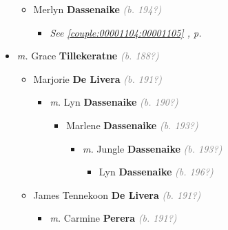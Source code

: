 \documentclass[10pt, openany]{book}
\begin{document}
\begin{itemize}
{\begin{itemize}
{\begin{itemize}
{\begin{itemize}
{\begin{itemize}
\end{itemize}
  }
\item{Merlyn  \textbf{Dassenaike} \textcolor{gray}{\textit{(b. 194?)}}
\begin{itemize}
\item{\textcolor{slteal}{\textit{See  \autoref{couple:00001104:00001105} \textit{, p. \pageref{couple:00001104:00001105} }}}}
\end{itemize}
  }
\end{itemize}}
\end{itemize}
   }
\end{itemize}}
\item{\textit{m.} Grace \textbf{Tillekeratne} \textcolor{gray}{\textit{(b. 188?)}}   \label{couple:00001138:00001139} \begin{itemize}
\item{Marjorie \textbf{De Livera} \textcolor{gray}{\textit{(b. 191?)}}
\begin{itemize}
\item{\textit{m.} Lyn \textbf{Dassenaike} \textcolor{gray}{\textit{(b. 190?)}}   \label{couple:00001140:00001141} \begin{itemize}
\item{Marlene \textbf{Dassenaike} \textcolor{gray}{\textit{(b. 193?)}}
\begin{itemize}
\item{\textit{m.} Jungle \textbf{Dassenaike} \textcolor{gray}{\textit{(b. 193?)}}   \label{couple:00001142:00001143} \begin{itemize}
\item{Lyn  \textbf{Dassenaike} \textcolor{gray}{\textit{(b. 196?)}}
  }
\end{itemize}}
\end{itemize}
 }
\end{itemize}}
\end{itemize}
  }
\item{James Tennekoon  \textbf{De Livera} \textcolor{gray}{\textit{(b. 191?)}}
\begin{itemize}
\item{\textit{m.} Carmine \textbf{Perera} \textcolor{gray}{\textit{(b. 191?)}}   \label{couple:00001156:00001157} \begin{itemize}

\end{itemize}}
\end{itemize}}
\end{itemize}}
\end{itemize}
\end{document}
